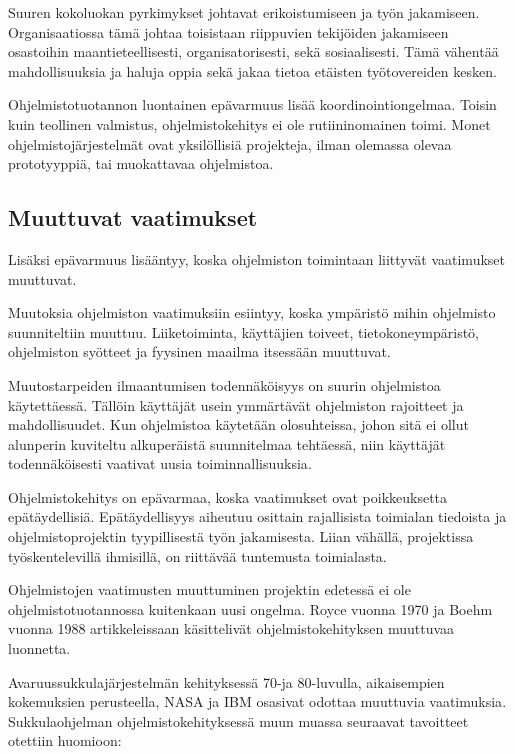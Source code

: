 \documentclass[finnish]{tktltiki2}
\theoremstyle{definition}
\theoremstyle{remark}
\begin{document}
Suuren kokoluokan pyrkimykset johtavat erikoistumiseen ja työn jakamiseen. Organisaatiossa tämä johtaa toisistaan riippuvien tekijöiden jakamiseen osastoihin maantieteellisesti, organisatorisesti, sekä sosiaalisesti. Tämä vähentää mahdollisuuksia ja haluja oppia sekä jakaa tietoa etäisten työtovereiden kesken\cite{KES95}.

Ohjelmistotuotannon luontainen epävarmuus lisää koordinointiongelmaa. Toisin kuin teollinen valmistus, ohjelmistokehitys ei ole rutiininomainen toimi. Monet ohjelmistojärjestelmät ovat yksilöllisiä projekteja, ilman olemassa olevaa prototyyppiä, tai muokattavaa ohjelmistoa\cite{KES95}.

\subsection{Muuttuvat vaatimukset}

Lisäksi epävarmuus lisääntyy, koska ohjelmiston toimintaan liittyvät vaatimukset muuttuvat\cite{KES95}.

Muutoksia ohjelmiston vaatimuksiin esiintyy, koska ympäristö mihin ohjelmisto suunniteltiin muuttuu. Liiketoiminta, käyttäjien toiveet, tietokoneympäristö, ohjelmiston syötteet ja fyysinen maailma itsessään muuttuvat\cite{KES95}.

Muutostarpeiden ilmaantumisen todennäköisyys on suurin ohjelmistoa käytettäessä. Tällöin käyttäjät usein ymmärtävät ohjelmiston rajoitteet ja mahdollisuudet. Kun ohjelmistoa käytetään olosuhteissa, johon sitä ei ollut alunperin kuviteltu alkuperäistä suunnitelmaa tehtäessä, niin käyttäjät todennäköisesti vaativat uusia toiminnallisuuksia\cite{KES95}.

Ohjelmistokehitys on epävarmaa, koska vaatimukset ovat poikkeuksetta epätäydellisiä. Epätäydellisyys aiheutuu osittain rajallisista toimialan tiedoista ja ohjelmistoprojektin tyypillisestä työn jakamisesta. Liian vähällä, projektissa työskentelevillä ihmisillä, on riittävää tuntemusta toimialasta\cite{KES95}.

Ohjelmistojen vaatimusten muuttuminen projektin edetessä ei ole ohjelmistotuotannossa kuitenkaan uusi ongelma. Royce vuonna 1970 ja Boehm vuonna 1988 artikkeleissaan\cite{ROY70}\cite{BOE88} käsittelivät ohjelmistokehityksen muuttuvaa luonnetta. 

Avaruussukkulajärjestelmän kehityksessä 70-ja 80-luvulla, aikaisempien kokemuksien perusteella, NASA ja IBM osasivat odottaa muuttuvia vaatimuksia\cite{MWR84}. Sukkulaohjelman ohjelmistokehityksessä muun muassa seuraavat tavoitteet otettiin huomioon: 
\end{document}
